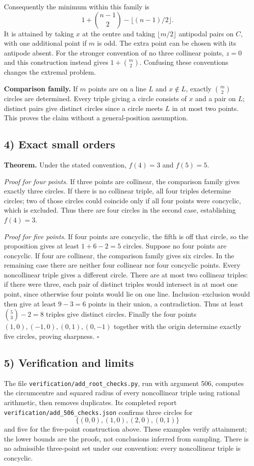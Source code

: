 Consequently the minimum within this family is
\[
 1+\binom{n-1}{2}-\lfloor(n-1)/2\rfloor.
\]
It is attained by taking $x$ at the centre and taking $\lfloor m/2\rfloor$ antipodal pairs on $C$, with one additional point if $m$ is odd. The extra point can be chosen with its antipode absent. For the stronger convention of no three collinear points, $z=0$ and this construction instead gives $1+\binom m2$. Confusing these conventions changes the extremal problem.

\textbf{Comparison family.} If $m$ points are on a line $L$ and $x\notin L$, exactly $\binom m2$ circles are determined. Every triple giving a circle consists of $x$ and a pair on $L$; distinct pairs give distinct circles since a circle meets $L$ in at most two points. This proves the claim without a general-position assumption.

\subsection*{4) Exact small orders}
\textbf{Theorem.} Under the stated convention, $f(4)=3$ and $f(5)=5$.

\emph{Proof for four points.} If three points are collinear, the comparison family gives exactly three circles. If there is no collinear triple, all four triples determine circles; two of those circles could coincide only if all four points were concyclic, which is excluded. Thus there are four circles in the second case, establishing $f(4)=3$.

\emph{Proof for five points.} If four points are concyclic, the fifth is off that circle, so the proposition gives at least $1+6-2=5$ circles. Suppose no four points are concyclic. If four are collinear, the comparison family gives six circles. In the remaining case there are neither four collinear nor four concyclic points. Every noncollinear triple gives a different circle. There are at most two collinear triples: if there were three, each pair of distinct triples would intersect in at most one point, since otherwise four points would lie on one line. Inclusion--exclusion would then give at least $9-3=6$ points in their union, a contradiction. Thus at least $\binom53-2=8$ triples give distinct circles. Finally the four points $(1,0),(-1,0),(0,1),(0,-1)$ together with the origin determine exactly five circles, proving sharpness. $\square$

\subsection*{5) Verification and limits}
The file \texttt{verification/add\_root\_checks.py}, run with argument 506, computes the circumcentre and squared radius of every noncollinear triple using rational arithmetic, then removes duplicates. Its completed report \texttt{verification/add\_506\_checks.json} confirms three circles for
\[
\{(0,0),(1,0),(2,0),(0,1)\}
\]
and five for the five-point construction above. These examples verify attainment; the lower bounds are the proofs, not conclusions inferred from sampling. There is no admissible three-point set under our convention: every noncollinear triple is concyclic.

